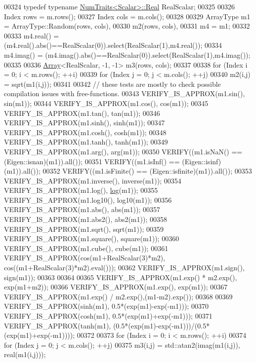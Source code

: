 \begin{DoxyCode}
00324   \textcolor{keyword}{typedef} \textcolor{keyword}{typename} \hyperlink{group___core___module_struct_eigen_1_1_num_traits}{NumTraits<Scalar>::Real} RealScalar;
00325 
00326   Index rows = m.rows();
00327   Index cols = m.cols();
00328 
00329   ArrayType m1 = ArrayType::Random(rows, cols),
00330             m2(rows, cols),
00331             m4 = m1;
00332   
00333   m4.real() = (m4.real().abs()==RealScalar(0)).select(RealScalar(1),m4.real());
00334   m4.imag() = (m4.imag().abs()==RealScalar(0)).select(RealScalar(1),m4.imag());
00335 
00336   \hyperlink{group___core___module_class_eigen_1_1_array}{Array}<RealScalar, -1, -1> m3(rows, cols);
00337 
00338   \textcolor{keywordflow}{for} (Index i = 0; i < m.rows(); ++i)
00339     \textcolor{keywordflow}{for} (Index j = 0; j < m.cols(); ++j)
00340       m2(i,j) = sqrt(m1(i,j));
00341 
00342   \textcolor{comment}{// these tests are mostly to check possible compilation issues with free-functions.}
00343   VERIFY\_IS\_APPROX(m1.sin(), sin(m1));
00344   VERIFY\_IS\_APPROX(m1.cos(), cos(m1));
00345   VERIFY\_IS\_APPROX(m1.tan(), tan(m1));
00346   VERIFY\_IS\_APPROX(m1.sinh(), sinh(m1));
00347   VERIFY\_IS\_APPROX(m1.cosh(), cosh(m1));
00348   VERIFY\_IS\_APPROX(m1.tanh(), tanh(m1));
00349   VERIFY\_IS\_APPROX(m1.arg(), arg(m1));
00350   VERIFY((m1.isNaN() == (Eigen::isnan)(m1)).all());
00351   VERIFY((m1.isInf() == (Eigen::isinf)(m1)).all());
00352   VERIFY((m1.isFinite() == (Eigen::isfinite)(m1)).all());
00353   VERIFY\_IS\_APPROX(m1.inverse(), inverse(m1));
00354   VERIFY\_IS\_APPROX(m1.log(), \hyperlink{structlog}{log}(m1));
00355   VERIFY\_IS\_APPROX(m1.log10(), log10(m1));
00356   VERIFY\_IS\_APPROX(m1.abs(), abs(m1));
00357   VERIFY\_IS\_APPROX(m1.abs2(), abs2(m1));
00358   VERIFY\_IS\_APPROX(m1.sqrt(), sqrt(m1));
00359   VERIFY\_IS\_APPROX(m1.square(), square(m1));
00360   VERIFY\_IS\_APPROX(m1.cube(), cube(m1));
00361   VERIFY\_IS\_APPROX(cos(m1+RealScalar(3)*m2), cos((m1+RealScalar(3)*m2).eval()));
00362   VERIFY\_IS\_APPROX(m1.sign(), sign(m1));
00363 
00364 
00365   VERIFY\_IS\_APPROX(m1.exp() * m2.exp(), exp(m1+m2));
00366   VERIFY\_IS\_APPROX(m1.exp(), exp(m1));
00367   VERIFY\_IS\_APPROX(m1.exp() / m2.exp(),(m1-m2).exp());
00368 
00369   VERIFY\_IS\_APPROX(sinh(m1), 0.5*(exp(m1)-exp(-m1)));
00370   VERIFY\_IS\_APPROX(cosh(m1), 0.5*(exp(m1)+exp(-m1)));
00371   VERIFY\_IS\_APPROX(tanh(m1), (0.5*(exp(m1)-exp(-m1)))/(0.5*(exp(m1)+exp(-m1))));
00372 
00373   \textcolor{keywordflow}{for} (Index i = 0; i < m.rows(); ++i)
00374     \textcolor{keywordflow}{for} (Index j = 0; j < m.cols(); ++j)
00375       m3(i,j) = std::atan2(imag(m1(i,j)), real(m1(i,j)));

\end{DoxyCode}
